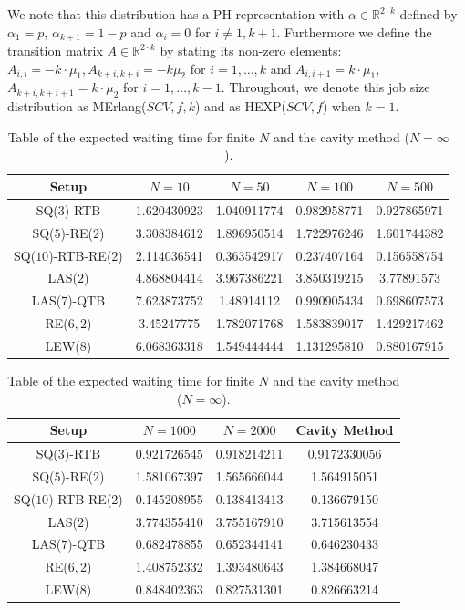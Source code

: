 \documentclass[12pt]{report}
\newcommand{\R}{\mathbb{R}}
\begin{document}
 We note that this distribution has a PH representation with $\alpha \in \R^{2\cdot k}$ defined by $\alpha_1 = p$, $\alpha_{k+1}=1-p$ and $\alpha_i=0$ for $i \neq 1, k+1$. Furthermore we define the transition matrix $A \in \R^{2\cdot k}$ by stating its non-zero elements: $A_{i,i}=-k \cdot \mu_1, A_{k+i, k+i} = -k\mu_2$ for $i=1,\dots,k$ and $A_{i,i+1} = k\cdot \mu_1$, $A_{k+i, k+i+1} = k \cdot \mu_2$ for $i=1,\dots,k-1$. Throughout, we denote this job size distribution as MErlang($SCV, f, k$) and as HEXP($SCV, f$) when $k=1$.

\begin{center}
\begin{table}[]
\begin{tabular}{c|cccc}
      Setup  & $N=10$ & $N=50$ & $N=100$ & $N=500$\\ \hline
 SQ($3$)-RTB & 1.620430923 & 1.040911774 & 0.982958771 & 0.927865971   \\
 SQ($5$)-RE($2$) & 3.308384612 &  1.896950514  & 1.722976246 &  1.601744382   \\
 SQ($10$)-RTB-RE($2$) &  2.114036541 &  0.363542917  & 0.237407164 &  0.156558754   \\
 LAS($2$) &  4.868804414 &  3.967386221  & 3.850319215 &  3.77891573    \\
 LAS($7$)-QTB &  7.623873752 &  1.48914112  & 0.990905434 &  0.698607573    \\
 RE($6, 2$) & 3.45247775 &  1.782071768  & 1.583839017 &  1.429217462   \\
 LEW($8$) &  6.068363318 &  1.549444444  & 1.131295810 &  0.880167915
\end{tabular}
\begin{tabular}{c|ccc}
      Setup  & $N=1000$ & $N=2000$ & Cavity Method \\ \hline
 SQ($3$)-RTB &  0.921726545 &  0.918214211 &  0.9172330056\\
 SQ($5$)-RE($2$) &  1.581067397 &  1.565666044 &  1.564915051 \\
 SQ($10$)-RTB-RE($2$) &  0.145208955 &  0.138413413 &  0.136679150  \\
 LAS($2$) &  3.774355410 &  3.755167910 &  3.715613554 \\
 LAS($7$)-QTB &  0.682478855 &  0.652344141 &  0.646230433  \\
 RE($6, 2$) &  1.408752332 &  1.393480643 &  1.384668047 \\
 LEW($8$) &  0.848402363 &  0.827531301 &  0.826663214
\end{tabular}
\caption{Table of the expected waiting time for finite $N$ and the cavity method ($N=\infty$).}
\label{table:finite_accuracy}
\end{table}
\end{center}
\end{document}

